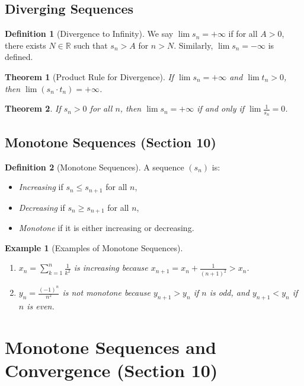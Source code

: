 \documentclass[9pt]{article}
\theoremstyle{definition}
\newtheorem{definition}{Definition}
\theoremstyle{plain}
\newtheorem{theorem}{Theorem}
\newtheorem{example}{Example}
\begin{document}
\subsection*{Diverging Sequences}
\begin{definition}[Divergence to Infinity]
We say \( \lim s_n = +\infty \) if for all \( A > 0 \), there exists \( N \in \mathbb{R} \) such that \( s_n > A \) for \( n > N \). Similarly, \( \lim s_n = -\infty \) is defined.
\end{definition}

\begin{theorem}[Product Rule for Divergence]
If \( \lim s_n = +\infty \) and \( \lim t_n > 0 \), then \( \lim (s_n \cdot t_n) = +\infty \).
\end{theorem}

\begin{theorem}
If \( s_n > 0 \) for all \( n \), then \( \lim s_n = +\infty \) if and only if \( \lim \frac{1}{s_n} = 0 \).
\end{theorem}

\subsection*{Monotone Sequences (Section 10)}
\begin{definition}[Monotone Sequences]
A sequence \( (s_n) \) is:
\begin{itemize}
    \item \textit{Increasing} if \( s_n \leq s_{n+1} \) for all \( n \),
    \item \textit{Decreasing} if \( s_n \geq s_{n+1} \) for all \( n \),
    \item \textit{Monotone} if it is either increasing or decreasing.
\end{itemize}
\end{definition}

\begin{example}[Examples of Monotone Sequences]
\leavevmode
\begin{enumerate}
    \item \( x_n = \sum_{k=1}^n \frac{1}{k^2} \) is increasing because \( x_{n+1} = x_n + \frac{1}{(n+1)^2} > x_n \).
    \item \( y_n = \frac{(-1)^n}{n^2} \) is not monotone because \( y_{n+1} > y_n \) if \( n \) is odd, and \( y_{n+1} < y_n \) if \( n \) is even.
\end{enumerate}
\end{example}
\section*{Monotone Sequences and Convergence (Section 10)}
\end{document}
